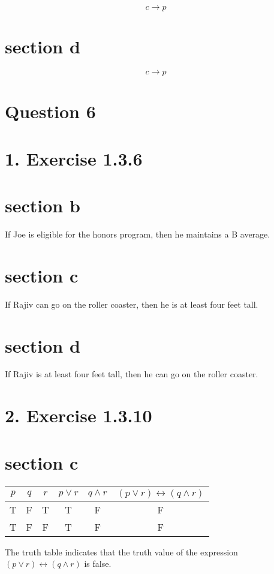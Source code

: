 \documentclass[10pt]{article}
\begin{document}
$$
c \rightarrow p
$$

\section*{section d}

$$
c \rightarrow p
$$

\pagebreak
\section*{Question 6}
\section*{1. Exercise 1.3.6}
\section*{section b}
If Joe is eligible for the honors program, then he maintains a B average.

\section*{section c}
If Rajiv can go on the roller coaster, then he is at least four feet tall.

\section*{section d}
If Rajiv is at least four feet tall, then he can go on the roller coaster.

\section*{2. Exercise 1.3.10}
\section*{section c}
\begin{center}
\begin{tabular}{|c|c|c|c|c|c|}
\hline
$p$ & $q$ & $r$ & $p \vee r$ & $q \wedge r$ & $(p \vee r) \leftrightarrow(q \wedge r)$ \\
\hline
T & F & T & T & F & F \\
\hline
T & F & F & T & F & F \\
\hline
\end{tabular}
\end{center}

The truth table indicates that the truth value of the expression $(p \vee r) \leftrightarrow(q \wedge r)$ is false.
\end{document}
